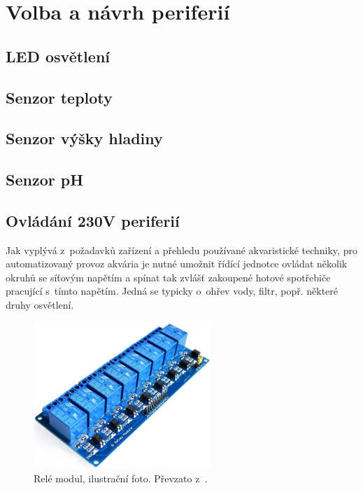 \chapter{Volba a návrh periferií}

\section{LED osvětlení}

\section{Senzor teploty}

\section{Senzor výšky hladiny}

\section{Senzor pH}

\section{Ovládání 230V periferií}

Jak vyplývá z~požadavků zařízení a přehledu používané akvaristické techniky, pro automatizovaný provoz akvária je nutné umožnit řídící jednotce ovládat několik okruhů se síťovým napětím a spínat tak zvlášť zakoupené hotové spotřebiče pracující s~tímto napětím. Jedná se typicky o~ohřev vody, filtr, popř. některé druhy osvětlení. 

\begin{figure}[h!]
    \centering
    \includegraphics[width=0.6\textwidth]{obrazky/230/rele.jpg}
    \caption{Relé modul, ilustrační foto. Převzato z~\cite{eshop-laskakit-rele}.}
    \label{fig:obrazky-230-rele-jpg}
\end{figure}

